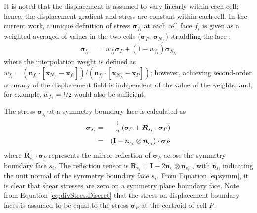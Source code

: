 \documentclass[sn-mathphys,Numbered]{sn-jnl}%
\newcommand{\bb}{\boldsymbol}
\begin{document}
It is noted that the displacement is assumed to vary linearly within each cell; hence, the displacement gradient and stress are constant within each cell.
In the current work, a unique definition of stress $\bb{\sigma}_{f_i}$ at each cell face $f_i$ is given as a weighted-averaged of values in the two cells ($\bb{\sigma}_P $, $\bb{\sigma}_{N_{f_i}}$) straddling the face \citep{Jasak1996}:
\begin{eqnarray} \label{eq:stressInterp}
	\bb{\sigma}_{f_i} &=& w_{f_i} \bb{\sigma}_P + (1 - w_{f_i}) \bb{\sigma}_{N_{f_i}}
\end{eqnarray}
where the interpolation weight is defined as $w_{f_i} = (\bb{n}_{f_i} \cdot [\bb{x}_{N_{f_i}} - \bb{x}_{f_i}])/(\bb{n}_{f_i} \cdot [\bb{x}_{N_{f_i}} - \bb{x}_{P} ])$; however, achieving second-order accuracy of the displacement field is independent of the value of the weights, and, for example, $w_{f_i} = \nicefrac{1}{2}$ would also be sufficient.

The stress $\bb{\sigma}_{s_i}$ at a symmetry boundary face is calculated as
\begin{eqnarray} \label{eq:symm}
	\bb{\sigma}_{s_i}
		&=& \frac{1}{2} \left (\bb{\sigma}_P + \bb{R}_{s_i} \cdot \bb{\sigma}_{P} \right) \notag \\
		&=& \left (\textbf{I} - \bb{n}_{s_i} \otimes \bb{n}_{s_i} \right) \cdot \bb{\sigma}_P
\end{eqnarray}
where $\bb{R}_{s_i} \cdot \bb{\sigma}_{P}$ represents the mirror reflection of $\bb{\sigma}_P$ across the symmetry boundary face $s_i$.
The reflection tensor is $\bb{R}_{s_i} = \textbf{I} - 2 \bb{n}_{s_i} \otimes \bb{n}_{s_i}$ \citep{Demirdzic2022}, with $\bb{n}_{s_i}$ indicating the unit normal of the symmetry boundary face $s_i$.
From Equation \ref{eq:symm}, it is clear that shear stresses are zero on a symmetry plane boundary face.
Note from Equation \ref{eq:divStressDiscret} that the stress on displacement boundary faces is assumed to be equal to the stress $\bb{\sigma}_P$ at the centroid of cell $P$.
\end{document}
